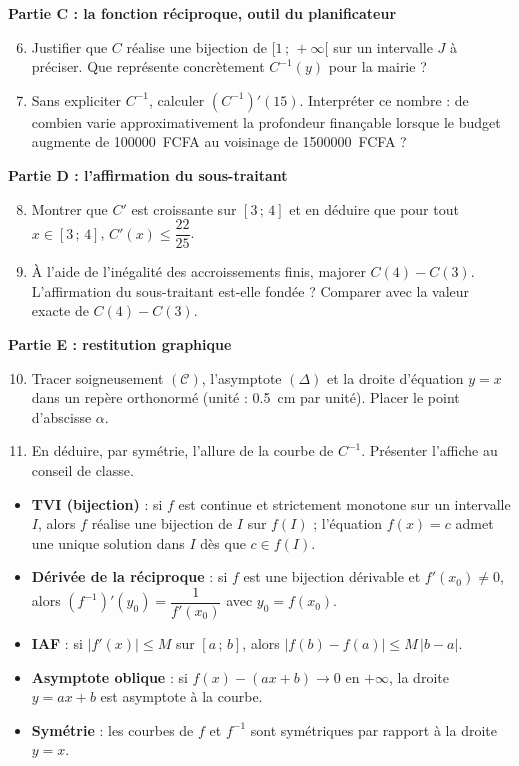 \documentclass[11pt]{article}
\newcommand{\cle}[1]{{\popxbold\color{popdark}#1}}
\newcounter{popsec}
\newcounter{popsub}
\newcommand{\courssub}[1]{%
  \stepcounter{popsub}%
  \par\vspace{9pt}\noindent{\popxbold\fontsize{11.5}{13}\selectfont\color{popink}{\color{poporange}\thepopsec.\thepopsub}\hspace{6pt}#1}\par\nopagebreak\vspace{4pt}
}
\begin{document}
\textbf{Partie C : la fonction réciproque, outil du planificateur}
\begin{enumerate}
\setcounter{enumi}{5}
\item Justifier que $C$ réalise une bijection de $[1\,;\,+\infty[$ sur un intervalle $J$ à préciser. Que représente concrètement $C^{-1}(y)$ pour la mairie ?
\item Sans expliciter $C^{-1}$, calculer $\left(C^{-1}\right)'(15)$. Interpréter ce nombre : de combien varie approximativement la profondeur finançable lorsque le budget augmente de \num{100000}~FCFA au voisinage de \num{1500000}~FCFA ?
\end{enumerate}

\textbf{Partie D : l'affirmation du sous-traitant}
\begin{enumerate}
\setcounter{enumi}{7}
\item Montrer que $C'$ est croissante sur $[3\,;\,4]$ et en déduire que pour tout $x\in[3\,;\,4]$, $C'(x)\leq \dfrac{22}{25}$.
\item À l'aide de l'inégalité des accroissements finis, majorer $C(4)-C(3)$. L'affirmation du sous-traitant est-elle fondée ? Comparer avec la valeur exacte de $C(4)-C(3)$.
\end{enumerate}

\textbf{Partie E : restitution graphique}
\begin{enumerate}
\setcounter{enumi}{9}
\item Tracer soigneusement $(\mathcal{C})$, l'asymptote $(\Delta)$ et la droite d'équation $y=x$ dans un repère orthonormé (unité : \SI{0,5}{cm} par unité). Placer le point d'abscisse $\alpha$.
\item En déduire, par symétrie, l'allure de la courbe de $C^{-1}$. Présenter l'affiche au conseil de classe.
\end{enumerate}

\courssub{Ressources à mobiliser}

\begin{aretenir}
\begin{itemize}
\item \textbf{TVI (bijection)} : si $f$ est \cle{continue} et \cle{strictement monotone} sur un intervalle $I$, alors $f$ réalise une bijection de $I$ sur $f(I)$ ; l'équation $f(x)=c$ admet une unique solution dans $I$ dès que $c\in f(I)$.
\item \textbf{Dérivée de la réciproque} : si $f$ est une bijection dérivable et $f'(x_0)\neq 0$, alors $\left(f^{-1}\right)'(y_0)=\dfrac{1}{f'(x_0)}$ avec $y_0=f(x_0)$.
\item \textbf{IAF} : si $|f'(x)|\leq M$ sur $[a\,;\,b]$, alors $|f(b)-f(a)|\leq M\,|b-a|$.
\item \textbf{Asymptote oblique} : si $f(x)-(ax+b)\to 0$ en $+\infty$, la droite $y=ax+b$ est asymptote à la courbe.
\item \textbf{Symétrie} : les courbes de $f$ et $f^{-1}$ sont symétriques par rapport à la droite $y=x$.
\end{itemize}
\end{aretenir}
\end{document}
